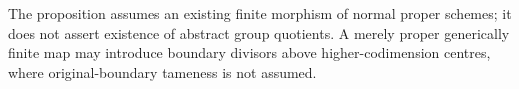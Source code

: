 \begin{remark}
The proposition assumes an existing finite morphism of normal
proper schemes; it does not assert existence of abstract group
quotients. A merely proper generically finite map may introduce
boundary divisors above higher-codimension centres, where
original-boundary tameness is not assumed.
\end{remark}
